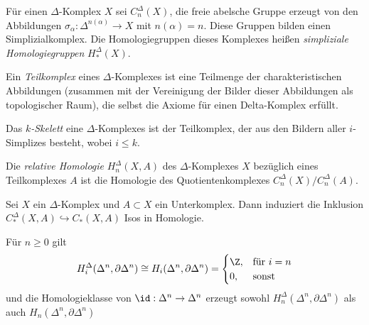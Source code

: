 \documentclass{cheat-sheet}
\begin{document}
\begin{defn}
  Für einen $\Delta$-Komplex $X$ sei $C_n^\Delta(X)$, die freie abelsche Gruppe erzeugt von den Abbildungen $\sigma_\alpha : \Delta^{n(\alpha)} \to X$ mit $n(\alpha) = n$. Diese Gruppen bilden einen Simplizialkomplex. Die Homologiegruppen dieses Komplexes heißen \emph{simpliziale Homologiegruppen} $H^\Delta_*(X)$.
\end{defn}

\begin{defn}
  Ein \emph{Teilkomplex} eines $\Delta$-Komplexes ist eine Teilmenge der charakteristischen Abbildungen (zusammen mit der Vereinigung der Bilder dieser Abbildungen als topologischer Raum), die selbst die Axiome für einen Delta-Komplex erfüllt.
\end{defn}

\begin{defn}
  Das \emph{$k$-Skelett} eine $\Delta$-Komplexes ist der Teilkomplex, der aus den Bildern aller $i$-Simplizes besteht, wobei $i \leq k$.
\end{defn}

\begin{defn}
  Die \emph{relative Homologie} $H_n^\Delta(X, A)$ des $\Delta$-Komplexes $X$ bezüglich eines Teilkomplexes $A$ ist die Homologie des Quotientenkomplexes $C_n^\Delta(X)/C_n^\Delta(A)$.
\end{defn}

\begin{satz}
  Sei $X$ ein $\Delta$-Komplex und $A \subset X$ ein Unterkomplex. Dann induziert die Inklusion $C_*^\Delta(X, A) \hookrightarrow C_*(X, A)$ Isos in Homologie.
\end{satz}

\begin{lem}
  Für $n \geq 0$ gilt
  \[
    H^\Delta_i(\Delta^n, \partial \Delta^n) \cong
    H_i(\Delta^n, \partial \Delta^n) =
    \begin{cases}
      \Z, & \text{für $i=n$} \\
      0, & \text{sonst}
    \end{cases}
  \]
  und die Homologieklasse von $\id : \Delta^n \to \Delta^n$ erzeugt sowohl $H^\Delta_n(\Delta^n, \partial \Delta^n)$ als auch $H_n(\Delta^n, \partial \Delta^n)$
\end{lem}
\end{document}
